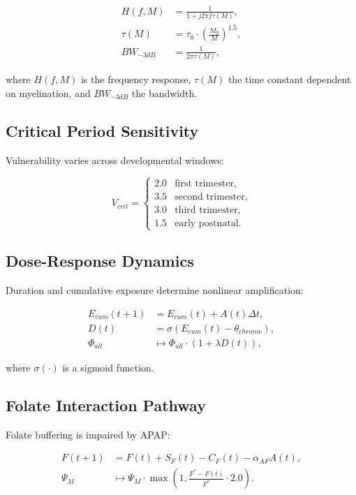 \documentclass[12pt]{article}
\begin{document}
\begin{align}
H(f,M) &= \frac{1}{1 + j2\pi f \tau(M)}, \\
\tau(M) &= \tau_0 \cdot \left(\frac{M_0}{M}\right)^{1.5}, \\
BW_{-3dB} &= \frac{1}{2\pi\tau(M)},
\end{align}

where $H(f,M)$ is the frequency response, $\tau(M)$ the time constant dependent on myelination, and $BW_{-3dB}$ the bandwidth.

\subsection{Critical Period Sensitivity}
Vulnerability varies across developmental windows:

\[
V_{crit} = \begin{cases}
2.0 & \text{first trimester}, \\
3.5 & \text{second trimester}, \\
3.0 & \text{third trimester}, \\
1.5 & \text{early postnatal}.
\end{cases}
\]

\subsection{Dose-Response Dynamics}
Duration and cumulative exposure determine nonlinear amplification:

\begin{align}
E_{cum}(t+1) &= E_{cum}(t) + A(t)\Delta t, \\
D(t) &= \sigma\left(E_{cum}(t) - \theta_{chronic}\right), \\
\Phi_{all} &\mapsto \Phi_{all} \cdot (1 + \lambda D(t)),
\end{align}

where $\sigma(\cdot)$ is a sigmoid function.

\subsection{Folate Interaction Pathway}
Folate buffering is impaired by APAP:

\begin{align}
F(t+1) &= F(t) + S_F(t) - C_F(t) - \alpha_{AF}A(t), \\
\Psi_M &\mapsto \Psi_M \cdot \max\left(1, \frac{F^* - F(t)}{F^*} \cdot 2.0\right).
\end{align}
\end{document}
